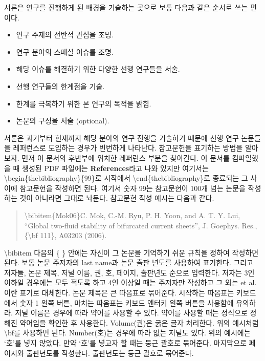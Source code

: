 \documentclass[twoside,11pt]{gshs_thesis}
\begin{document}
서론은 연구를 진행하게 된 배경을 기술하는 곳으로 보통 다음과 같은 순서로 쓰는 편이다.
\begin{itemize}
\item{연구 주제의 전반적 관심을 조명.}
\item{연구 분야의 스페셜 이슈를 조명.}
\item{해당 이슈를 해결하기 위한 다양한 선행 연구들을 서술.}
\item{선행 연구들의 한계점을 기술.}
\item{한계를 극복하기 위한 본 연구의 목적을 밝힘.}
\item{논문의 구성을 서술 (optional).}
\end{itemize}
서론은 과거부터 현재까지 해당 분야의 연구 진행을 기술하기 때문에 선행 연구 논문들을 레퍼런스로 도입하는 경우가 빈번하게 나타난다.  참고문헌을 표기하는 방법을 알아보자. 먼저 이 문서의 후반부에 위치한 레퍼런스 부분을 찾아간다. 이 문서를 컴파일했을 때 생성된 PDF 파일에는 {\bf References}라고 나와 있지만 여기서는 {\textbackslash}begin\{thebibliography\}\{99\}로 시작에서 {\textbackslash}end\{thebibliography\}로 종료되는 그 사이에 참고문헌을 작성하면 된다. 여기서 숫자 99는 참고문헌이 100개 넘는 논문을 작성하는 것이 아니라면 그대로 놔둔다. 참고문헌 작성 예시는 다음과 같다.
\begin{quote}
{\textbackslash}bibitem\{Mok06\}C. Mok, C.-M. Ryu, P. H. Yoon, and A. T. Y. Lui, ``Global two-fluid stability of bifurcated current sheets'', J. Goephys. Res., \{{\textbackslash}bf 111\}, A03203 (2006).
\end{quote}
{\textbackslash}bibitem 다음의 \{ \} 안에는 자신이 그 논문을 기억하기 쉬운 규칙을 정하여 작성하면 된다. 보통 논문 주저자의 last name과 논문 출판 년도를 사용하여 표기한다. 그리고 저자들, 논문 제목, 저널 이름, 권, 호, 페이지, 출판년도 순으로 입력한다. 저자는 3인 이하일 경우에는 모두 적도록 하고 4인 이상일 때는 주저자만 작성하고 그 외는 et al.이란 표기로 대체한다. 논문 제목은 큰 따옴표로 묶어준다.  시작하는 따옴표는 키보드에서 숫자 1 왼쪽 버튼, 마치는 따옴표는 키보드 엔터키 왼쪽 버튼을 사용함에 유의하라. 저널 이름은 경우에 따라 약어를 사용할 수 있다. 약어를 사용할 때는 정식으로 정해진 약어임을 확인한 후 사용한다. Volume(권)은 굵은 글자 처리한다. 위의 예시처럼 {\textbackslash}bf를 사용하면 된다. Number(호)는 경우에 따라 없는 저널도 있다. 위의 예시에는 `호'를 넣지 않았다. 만약 `호'를 넣고자 할 때는 둥근 괄호로 묶어준다. 마지막으로 페이지와 출판년도를 작성한다. 출판년도는 둥근 괄호로 묶어준다.
\end{document}
